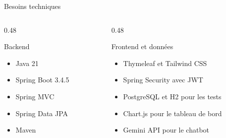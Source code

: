 \documentclass[10pt,aspectratio=169]{beamer}
\begin{document}
\begin{frame}{Besoins techniques}
    \begin{columns}[T,onlytextwidth]
        \begin{column}{0.48\textwidth}
            \begin{block}{Backend}
                \begin{itemize}
                    \item Java 21
                    \item Spring Boot 3.4.5
                    \item Spring MVC
                    \item Spring Data JPA
                    \item Maven
                \end{itemize}
            \end{block}
        \end{column}
        \begin{column}{0.48\textwidth}
            \begin{block}{Frontend et données}
                \begin{itemize}
                    \item Thymeleaf et Tailwind CSS
                    \item Spring Security avec JWT
                    \item PostgreSQL et H2 pour les tests
                    \item Chart.js pour le tableau de bord
                    \item Gemini API pour le chatbot
                \end{itemize}
            \end{block}
        \end{column}
    \end{columns}
\end{frame}
\end{document}
